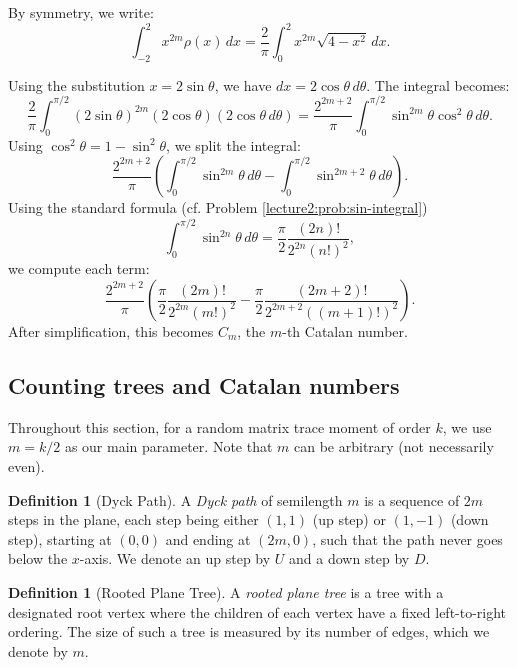 \documentclass[letterpaper,11pt,oneside,reqno]{book}
\numberwithin{equation}{chapter}  %
\theoremstyle{definition}
\newtheorem{definition}[proposition]{Definition}
\begin{document}
By symmetry, we write:
\[
\int_{-2}^2 x^{2m}\rho(x)\, dx = \frac{2}{\pi} \int_0^2 x^{2m} \sqrt{4-x^2}\, dx.
\]

Using the substitution \(x = 2\sin\theta\), we have \(dx = 2\cos\theta\, d\theta\). The integral becomes:
\[
\frac{2}{\pi} \int_0^{\pi/2} (2\sin\theta)^{2m} (2\cos\theta) (2\cos\theta\, d\theta)
= \frac{2^{2m+2}}{\pi} \int_0^{\pi/2} \sin^{2m}\theta \cos^2\theta\, d\theta.
\]
Using \(\cos^2\theta = 1 - \sin^2\theta\), we split the integral:
\[
\frac{2^{2m+2}}{\pi} \left( \int_0^{\pi/2} \sin^{2m}\theta\, d\theta - \int_0^{\pi/2} \sin^{2m+2}\theta\, d\theta \right).
\]
Using the standard formula (cf. Problem \ref{lecture2:prob:sin-integral})
\begin{equation}
	\label{lecture2:eq:sin-integral}
\int_0^{\pi/2} \sin^{2n}\theta\, d\theta = \frac{\pi}{2} \frac{(2n)!}{2^{2n} (n!)^2},
\end{equation}
we compute each term:
\[
\frac{2^{2m+2}}{\pi} \left( \frac{\pi}{2} \frac{(2m)!}{2^{2m}(m!)^2} - \frac{\pi}{2} \frac{(2m+2)!}{2^{2m+2}((m+1)!)^2} \right).
\]
After simplification, this becomes
$C_m$, the $m$-th Catalan number.

\subsection{Counting trees and Catalan numbers}

Throughout this section, for a random matrix trace moment of order $k$,
we use $m=k/2$ as our main parameter. Note that $m$ can be arbitrary
(not necessarily even).

\begin{definition}[Dyck Path]
A \emph{Dyck path} of semilength $m$ is a sequence of $2m$ steps in the plane, each step being either $(1,1)$ (up step) or $(1,-1)$ (down step), starting at $(0,0)$ and ending at $(2m,0)$, such that the path never goes below the $x$-axis. We denote an up step by $U$ and a down step by $D$.
\end{definition}

\begin{definition}[Rooted Plane Tree]
A \emph{rooted plane tree} is a tree with a designated root vertex where the children of each vertex have a fixed left-to-right ordering. The size of such a tree is measured by its number of edges, which we denote by $m$.
\end{definition}
\end{document}
